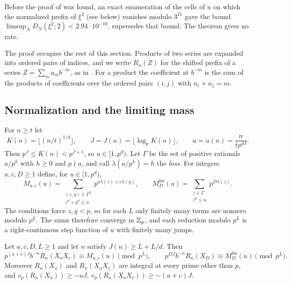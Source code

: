 \documentclass[11pt]{article}
\begin{document}
\begin{remark}\label{rem:history}
Before the proof of  was found, an exact enumeration of the cells of $u$ on which
the normalized prefix of $\xi^2$ (see  below) vanishes modulo $3^{21}$ gave the bound
$\limsup_ND_N(\xi^2;2)<2.94\cdot10^{-10}$.  supersedes that
bound. The theorem gives no rate.
\end{remark}

The proof occupies the rest of this section. Products of two series are expanded into ordered pairs of
indices, and we write $R_n(Z)$ for the shifted prefix of a series $Z=\sum_ma_mb^{-m}$, as in
. For a product the coefficient at $b^{-m}$ is the sum of the products of
coefficients over the ordered pairs $(i,j)$ with $n_i+n_j=m$.

\subsection{Normalization and the limiting mass}

For $n\ge t$ let
\[
K(n)=\lfloor(n/t)^{1/d}\rfloor,\qquad J=J(n)=\lfloor\log_pK(n)\rfloor,\qquad u=u(n)=\frac{n}{tp^{dJ}} .
\]
Then $p^J\le K(n)<p^{J+1}$, so $u\in[1,p^d)$. Let $\Gamma$ be the set of positive rationals $a/p^h$ with
$h\ge0$ and $p\nmid a$, and call $\lambda(a/p^h)=h$ the \emph{loss}. For integers $a,c,D\ge1$ define, for
$u\in[1,p^d)$,
\[
M_{a,c}(u)=\sum_{\substack{(z,y)\in\Gamma^2\\ z^d+y^d\le u}}p^{a\lambda(z)+c\lambda(y)},\qquad
M^{\mathrm{lin}}_D(u)=\sum_{\substack{z\in\Gamma\\ z^d\le u}}p^{D\lambda(z)} .
\]
The conditions force $z,y<p$, so for each $L$ only finitely many terms are nonzero modulo $p^L$. The
sums therefore converge in $\mathbb Z_p$, and each reduction modulo $p^L$ is a right-continuous step function
of $u$ with finitely many jumps.

\begin{lemma}[Freezing]\label{lem:freeze}
Let $a,c,D,L\ge1$ and let $n$ satisfy $J(n)\ge L+L/d$. Then
\[
p^{(a+c)J}b^{-n}R_n(X_aX_c)\equiv M_{a,c}(u)\pmod{p^L},\qquad
p^{DJ}b^{-n}R_n(X_D)\equiv M^{\mathrm{lin}}_D(u)\pmod{p^L}.
\]
Moreover $R_n(X_a)$ and $R_n(X_aX_c)$ are integral at every prime other than $p$, and
$v_p(R_n(X_a))\ge-aJ$, $v_p(R_n(X_aX_c))\ge-(a+c)J$.
\end{lemma}
\end{document}
